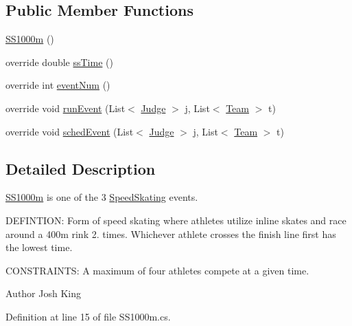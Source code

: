 \subsection*{Public Member Functions}
\begin{DoxyCompactItemize}
\item 
\hyperlink{classPCO_1_1SS1000m_a4e960f497e8a5e1f685966fe258974a3}{S\+S1000m} ()
\item 
override double \hyperlink{classPCO_1_1SS1000m_a20cf8a97d91bb661439b1c251942b68a}{ss\+Time} ()
\item 
override int \hyperlink{classPCO_1_1SS1000m_a7087df2094b075191b778e7b56ea07fd}{event\+Num} ()
\item 
override void \hyperlink{classPCO_1_1SS1000m_a00263d1777d343e9485a0da0e5e7f910}{run\+Event} (List$<$ \hyperlink{classPCO_1_1Judge}{Judge} $>$ j, List$<$ \hyperlink{classPCO_1_1Team}{Team} $>$ t)
\item 
override void \hyperlink{classPCO_1_1SS1000m_a883e286f1896171885422cf5c143c2da}{sched\+Event} (List$<$ \hyperlink{classPCO_1_1Judge}{Judge} $>$ j, List$<$ \hyperlink{classPCO_1_1Team}{Team} $>$ t)
\end{DoxyCompactItemize}


\subsection{Detailed Description}
\hyperlink{classPCO_1_1SS1000m}{S\+S1000m} is one of the 3 \hyperlink{classPCO_1_1SpeedSkating}{Speed\+Skating} events. 

D\+E\+F\+I\+N\+T\+I\+O\+N\+: Form of speed skating where athletes utilize inline skates and race around a 400m rink 2. times. Whichever athlete crosses the finish line first has the lowest time.

C\+O\+N\+S\+T\+R\+A\+I\+N\+T\+S\+: A maximum of four athletes compete at a given time.\begin{DoxyAuthor}{Author}
Josh King 
\end{DoxyAuthor}


Definition at line 15 of file S\+S1000m.\+cs.



